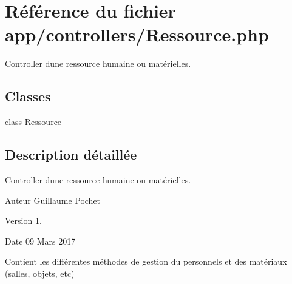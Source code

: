 \hypertarget{_ressource_8php}{}\section{Référence du fichier app/controllers/\+Ressource.php}
\label{_ressource_8php}


Controller d\textquotesingle{}une ressource humaine ou matérielles.  


\subsection*{Classes}
\begin{DoxyCompactItemize}
\item 
class \hyperlink{class_ressource}{Ressource}
\end{DoxyCompactItemize}


\subsection{Description détaillée}
Controller d\textquotesingle{}une ressource humaine ou matérielles. 

\begin{DoxyAuthor}{Auteur}
Guillaume Pochet 
\end{DoxyAuthor}
\begin{DoxyVersion}{Version}
1. 
\end{DoxyVersion}
\begin{DoxyDate}{Date}
09 Mars 2017
\end{DoxyDate}
Contient les différentes méthodes de gestion du personnels et des matériaux (salles, objets, etc) 